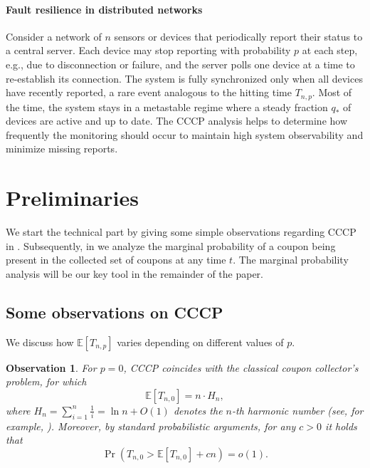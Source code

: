 \documentclass[11pt,a4paper]{article}
\newtheorem{observation}[theorem]{Observation}
\newcommand{\E}{\mathbb{E}}
\begin{document}
\paragraph*{Fault resilience in distributed networks}
Consider a network of $n$ sensors or devices that periodically report their status to a central server.
Each device may stop reporting with probability $p$ at each step, e.g., due to disconnection or failure, and the server polls one device at a time to re-establish its connection.
The system is fully synchronized only when all devices have recently reported, a rare event analogous to the hitting time $T_{n,p}$.
Most of the time, the system stays in a metastable regime where a steady fraction $q_*$ of devices are active and up to date. The CCCP analysis helps to determine how frequently the monitoring should occur to maintain high system observability and minimize missing reports.

\section{Preliminaries}\label{sec:prel}

We start the technical part by giving some simple observations regarding CCCP in . Subsequently, in  we analyze the marginal probability of a coupon being present in the collected set of coupons at any time $t$. 
The marginal probability analysis will be our key tool in the remainder of the paper.

\subsection{Some observations on CCCP}
\label{sec:someobservations}

We discuss how $\E[T_{n,p}]$ varies depending on different values of $p$.
\begin{observation}\label{obs:classical ccp}
For $p = 0$, CCCP coincides with the classical coupon collector's problem, for which 
\[
    \E[T_{n,0}] = n \cdot H_n,
\]
where $H_n = \sum_{i=1}^{n} \frac{1}{i} = \ln n + O(1)$ denotes the $n$-th harmonic number (see, for example, \cite[Section 2.4.1]{mitzenmacher2017probability}).
Moreover, by standard probabilistic arguments, for any $c>0$ it holds that
\[
    \Pr(T_{n,0} > \E[T_{n,0}] + cn) = o(1).
\]
\end{observation}
\end{document}
